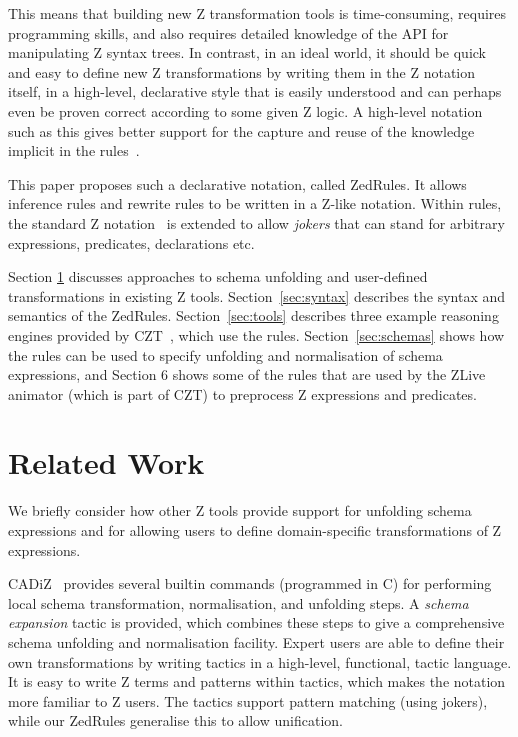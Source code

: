 \documentclass{entcs}
\begin{document}
This means that building new Z transformation tools is time-consuming,
requires programming skills, and also requires detailed knowledge of the
API for manipulating Z syntax trees.  In contrast, in an ideal world, it
should be quick and easy to define new Z transformations by writing them in
the Z notation itself, in a high-level, declarative style that is easily
understood and can perhaps even be proven correct according to some given Z
logic.  A high-level notation such as this gives better support for the
capture and reuse of the knowledge implicit in the
rules~\cite{armour:business-model00}.

This paper proposes such a declarative notation, called ZedRules.  It
allows inference rules and rewrite rules to be written in a Z-like
notation.  Within rules, the standard Z notation~\cite{ISOZ} is extended to
allow \emph{jokers} that can stand for arbitrary expressions, predicates,
declarations etc.

Section \ref{sec:relwork} discusses approaches to schema unfolding and
user-defined transformations in existing Z tools.
Section~\ref{sec:syntax} describes the syntax and semantics of the
ZedRules.  Section~\ref{sec:tools} describes three example reasoning
engines provided by CZT~\cite{malik:czt05}, which use the rules.
Section~\ref{sec:schemas} shows how the rules can be used to specify
unfolding and normalisation of schema expressions,
and Section 6 shows some of the rules
that are used by the ZLive animator (which is part of CZT)
to preprocess Z expressions and predicates.


\section{Related Work} \label{sec:relwork}

We briefly consider how other Z tools provide support for unfolding
schema expressions and for allowing users to define domain-specific
transformations of Z expressions.

CADiZ~\cite{cadiz:refman02} provides several builtin commands (programmed
in C) for performing local schema transformation, normalisation, and
unfolding steps.  A \emph{schema expansion} tactic is provided, which
combines these steps to give a comprehensive schema unfolding and
normalisation facility.  Expert users are able to define their own
transformations by writing tactics in a high-level, functional, tactic
language.  It is easy to write Z terms and patterns within tactics, which
makes the notation more familiar to Z users.  The tactics support pattern
matching (using jokers), while our ZedRules generalise this to allow
unification.
\end{document}
